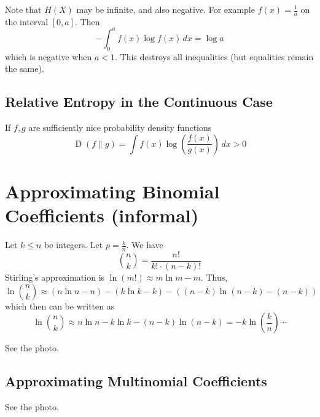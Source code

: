 \documentclass{article}
\begin{document}
Note that $H(X)$ may be infinite, and also negative. For example $f(x)=\frac{1}{a}$ on the interval $[0,a]$. Then
\[
-\int_0^a f(x)\log f(x)\, dx = \log a
\]
which is negative when $a< 1$. This destroys all inequalities (but equalities remain the same).

\subsection{Relative Entropy in the Continuous Case}

If $f,g$ are sufficiently nice probability density functions 
\[
\operatorname{D}(f\| g)=\int f(x)\log\left(\frac{f(x)}{g(x)}\right)\, dx >0
\]

\section{Approximating Binomial Coefficients (informal)}

Let $k\leq n$ be integers. Let $p=\frac{k }{n }$. We have 
\[
\binom{n }{k }=\frac{n!}{k!\cdot \left(n-k\right)!}
\]
Stirling's approximation is $\ln(m!)\approx m\ln m-m$. Thus,
\[
\ln\binom{n }{k }\approx \left(n\ln n -n\right)- \left(k\ln k -k\right) - \left(\left(n-k\right)\ln\left(n-k\right)-\left(n-k\right)\right)
\]
which then can be written as 
\[
\ln\binom{n }{k }\approx n\ln n -k\ln k - \left(n-k\right)\ln \left(n-k\right) = -k \ln \left(\frac{k}{n}\right)\cdots
\]

See the photo.

\subsection{Approximating Multinomial Coefficients}

See the photo.
\end{document}
